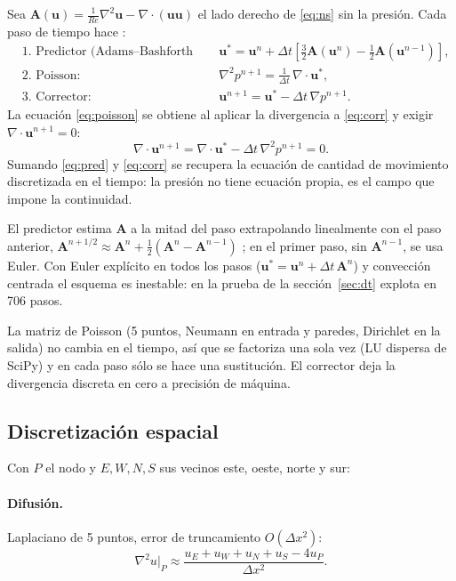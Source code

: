 \documentclass[11pt,letterpaper]{article}
\newcommand{\vu}{\mathbf{u}}
\newcommand{\Rey}{\mathit{Re}}
\begin{document}
Sea $\mathbf A(\vu)=\tfrac{1}{\Rey}\nabla^2\vu-\nabla\cdot(\vu\vu)$ el lado derecho de \eqref{eq:ns} sin la presión.
Cada paso de tiempo hace \cite{chorin}:
\begin{align}
&\text{1. Predictor (Adams–Bashforth 2):} && \vu^*=\vu^n+\Delta t\left[\tfrac32\mathbf A(\vu^n)-\tfrac12\mathbf A(\vu^{n-1})\right], \label{eq:pred}\\
&\text{2. Poisson:} && \nabla^2p^{n+1}=\frac{1}{\Delta t}\,\nabla\cdot\vu^*, \label{eq:poisson}\\
&\text{3. Corrector:} && \vu^{n+1}=\vu^*-\Delta t\,\nabla p^{n+1}. \label{eq:corr}
\end{align}
La ecuación \eqref{eq:poisson} se obtiene al aplicar la divergencia a \eqref{eq:corr} y exigir $\nabla\cdot\vu^{n+1}=0$:
\begin{equation}
\nabla\cdot\vu^{n+1}=\nabla\cdot\vu^*-\Delta t\,\nabla^2p^{n+1}=0 .
\end{equation}
Sumando \eqref{eq:pred} y \eqref{eq:corr} se recupera la ecuación de cantidad de movimiento discretizada en el tiempo:
la presión no tiene ecuación propia, es el campo que impone la continuidad.

El predictor estima $\mathbf A$ a la mitad del paso extrapolando linealmente con el paso anterior,
$\mathbf A^{n+1/2}\approx\mathbf A^n+\tfrac12(\mathbf A^n-\mathbf A^{n-1})$ \cite{kimmoin}; en el primer paso, sin
$\mathbf A^{n-1}$, se usa Euler. Con Euler explícito en todos los pasos ($\vu^*=\vu^n+\Delta t\,\mathbf A^n$) y
convección centrada el esquema es inestable: en la prueba de la sección~\ref{sec:dt} explota en 706 pasos.

La matriz de Poisson (5 puntos, Neumann en entrada y paredes, Dirichlet en la salida) no cambia en el tiempo, así que se
factoriza una sola vez (LU dispersa de SciPy) y en cada paso sólo se hace una sustitución. El corrector deja la
divergencia discreta en cero a precisión de máquina.

\subsection{Discretización espacial}

Con $P$ el nodo y $E,W,N,S$ sus vecinos este, oeste, norte y sur:

\paragraph{Difusión.} Laplaciano de 5 puntos, error de truncamiento $O(\Delta x^2)$:
\begin{equation}
\nabla^2u\big|_P\approx\frac{u_E+u_W+u_N+u_S-4u_P}{\Delta x^2}.
\end{equation}
\end{document}
